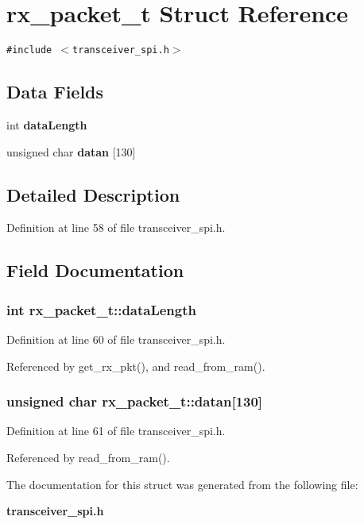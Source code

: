 \section{rx\_\-packet\_\-t Struct Reference}
\label{structrx__packet__t}
{\tt \#include $<$transceiver\_\-spi.h$>$}

\subsection*{Data Fields}
\begin{CompactItemize}
\item 
int {\bf data\-Length}
\item 
unsigned char {\bf datan} [130]
\end{CompactItemize}


\subsection{Detailed Description}




Definition at line 58 of file transceiver\_\-spi.h.

\subsection{Field Documentation}
\subsubsection{\setlength{\rightskip}{0pt plus 5cm}int {\bf rx\_\-packet\_\-t::data\-Length}}\label{structrx__packet__t_3223abf8e323b79db842eb37cefed0eb}




Definition at line 60 of file transceiver\_\-spi.h.

Referenced by get\_\-rx\_\-pkt(), and read\_\-from\_\-ram().
\subsubsection{\setlength{\rightskip}{0pt plus 5cm}unsigned char {\bf rx\_\-packet\_\-t::datan}[130]}\label{structrx__packet__t_36c367cac05005327bb56c7e7e5ea9c7}




Definition at line 61 of file transceiver\_\-spi.h.

Referenced by read\_\-from\_\-ram().

The documentation for this struct was generated from the following file:\begin{CompactItemize}
\item 
{\bf transceiver\_\-spi.h}\end{CompactItemize}
